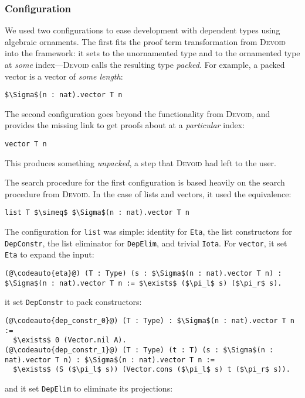\subsubsection{Configuration}

We used two configurations to ease development with dependent types using algebraic ornaments.
The first fits the proof term transformation from \textsc{Devoid} into the \toolname framework:
it sets \A to the unornamented type and \B to the ornamented type at \textit{some} index---\textsc{Devoid}
calls the resulting type \textit{packed}. For example, a packed vector is a vector of \textit{some length}:

\begin{lstlisting}
$\Sigma$(n : nat).vector T n
\end{lstlisting}
The second configuration goes beyond the functionality from \textsc{Devoid}, and provides
the missing link to get proofs about \B at a \textit{particular} index:

\begin{lstlisting}
vector T n
\end{lstlisting}
This produces something \textit{unpacked},
a step that \textsc{Devoid} had left to the user.

The search procedure for the first configuration is based heavily on the search procedure from \textsc{Devoid}.
In the case of lists and vectors, it used the equivalence:

\begin{lstlisting}
list T $\simeq$ $\Sigma$(n : nat).vector T n
\end{lstlisting}
The configuration for \lstinline{list} was simple: identity for \lstinline{Eta},
the list constructors for \lstinline{DepConstr}, the list eliminator for \lstinline{DepElim},
and trivial \lstinline{Iota}.
For \lstinline{vector}, it set \lstinline{Eta} to expand the input:

\begin{lstlisting}
(@\codeauto{eta}@) (T : Type) (s : $\Sigma$(n : nat).vector T n) : $\Sigma$(n : nat).vector T n := $\exists$ ($\pi_l$ s) ($\pi_r$ s).
\end{lstlisting}
it set \lstinline{DepConstr} to pack constructors: %

\begin{lstlisting}
(@\codeauto{dep_constr_0}@) (T : Type) : $\Sigma$(n : nat).vector T n :=
  $\exists$ 0 (Vector.nil A).
(@\codeauto{dep_constr_1}@) (T : Type) (t : T) (s : $\Sigma$(n : nat).vector T n) : $\Sigma$(n : nat).vector T n :=
  $\exists$ (S ($\pi_l$ s)) (Vector.cons ($\pi_l$ s) t ($\pi_r$ s)).
\end{lstlisting}
and it set \lstinline{DepElim} to eliminate its projections:

